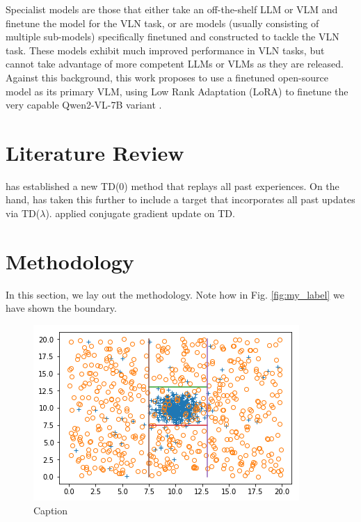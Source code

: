\documentclass{svproc}
\begin{document}
    \newline
    Specialist models \cite{hong2021_vlnbert, navgpt2, chen2021_HAMT, HE2024110511_MemoryAdaptiveVLN} are those that either take an off-the-shelf LLM or VLM and finetune the model for the VLN task, or are models (usually consisting of multiple sub-models) specifically finetuned and constructed to tackle the VLN task. These models exhibit much improved performance in VLN tasks, but cannot take advantage of more competent LLMs or VLMs as they are released.
    \newline
    Against this background, this work proposes to use a finetuned open-source model as its primary VLM, using Low Rank Adaptation (LoRA) \cite{citatation_required} to finetune the very capable Qwen2-VL-7B variant \cite{citation_required}.
    
\section{Literature Review}
    \cite{TD0-Replay} has established a new TD(0) method that replays all past experiences. On the hand, \cite{TD-Replay} has taken this further to include a target that incorporates all past updates via TD($\lambda$). \cite{ConjugateTD} applied conjugate gradient update on TD.


\section{Methodology}
    In this section, we lay out the methodology. Note how in Fig. \ref{fig:my_label} we have shown the boundary.


    \begin{figure}
        \centering
        \includegraphics[scale=.75]{figures/DecisionBoundary.png}
        \caption{Caption}
        \label{fig:fig2}
    \end{figure}
\end{document}
